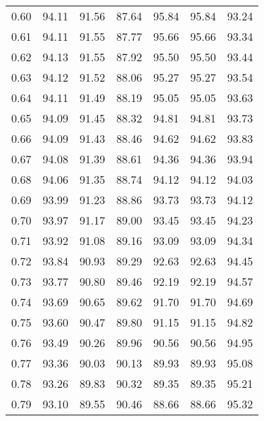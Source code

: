 \begin{tabular}{|c|c|c|c|c|c|c|}
      0.60 &     94.11 &     91.56 &      87.64 &   95.84 &      95.84 &         93.24 \\
      0.61 &     94.11 &     91.55 &      87.77 &   95.66 &      95.66 &         93.34 \\
      0.62 &     94.13 &     91.55 &      87.92 &   95.50 &      95.50 &         93.44 \\
      0.63 &     94.12 &     91.52 &      88.06 &   95.27 &      95.27 &         93.54 \\
      0.64 &     94.11 &     91.49 &      88.19 &   95.05 &      95.05 &         93.63 \\
      0.65 &     94.09 &     91.45 &      88.32 &   94.81 &      94.81 &         93.73 \\
      0.66 &     94.09 &     91.43 &      88.46 &   94.62 &      94.62 &         93.83 \\
      0.67 &     94.08 &     91.39 &      88.61 &   94.36 &      94.36 &         93.94 \\
      0.68 &     94.06 &     91.35 &      88.74 &   94.12 &      94.12 &         94.03 \\
      0.69 &     93.99 &     91.23 &      88.86 &   93.73 &      93.73 &         94.12 \\
      0.70 &     93.97 &     91.17 &      89.00 &   93.45 &      93.45 &         94.23 \\
      0.71 &     93.92 &     91.08 &      89.16 &   93.09 &      93.09 &         94.34 \\
      0.72 &     93.84 &     90.93 &      89.29 &   92.63 &      92.63 &         94.45 \\
      0.73 &     93.77 &     90.80 &      89.46 &   92.19 &      92.19 &         94.57 \\
      0.74 &     93.69 &     90.65 &      89.62 &   91.70 &      91.70 &         94.69 \\
      0.75 &     93.60 &     90.47 &      89.80 &   91.15 &      91.15 &         94.82 \\
      0.76 &     93.49 &     90.26 &      89.96 &   90.56 &      90.56 &         94.95 \\
      0.77 &     93.36 &     90.03 &      90.13 &   89.93 &      89.93 &         95.08 \\
      0.78 &     93.26 &     89.83 &      90.32 &   89.35 &      89.35 &         95.21 \\
      0.79 &     93.10 &     89.55 &      90.46 &   88.66 &      88.66 &         95.32 \\

\end{tabular}
